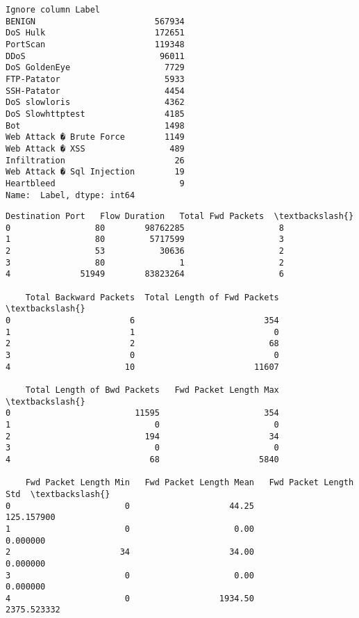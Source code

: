 \documentclass[11pt]{article}
\makeatletter
\newcommand{\boxspacing}{\kern\kvtcb@left@rule\kern\kvtcb@boxsep}
\newcommand{\prompt}[4]{
        \ttfamily\llap{{\color{#2}[#3]:\hspace{3pt}#4}}\vspace{-\baselineskip}
    }
\makeatother
\begin{document}
    \begin{Verbatim}[commandchars=\\\{\}]
Ignore column Label
BENIGN                        567934
DoS Hulk                      172651
PortScan                      119348
DDoS                           96011
DoS GoldenEye                   7729
FTP-Patator                     5933
SSH-Patator                     4454
DoS slowloris                   4362
DoS Slowhttptest                4185
Bot                             1498
Web Attack � Brute Force        1149
Web Attack � XSS                 489
Infiltration                      26
Web Attack � Sql Injection        19
Heartbleed                         9
Name:  Label, dtype: int64
    \end{Verbatim}

            \begin{tcolorbox}[breakable, size=fbox, boxrule=.5pt, pad at break*=1mm, opacityfill=0]
\prompt{Out}{outcolor}{11}{\boxspacing}
\begin{Verbatim}[commandchars=\\\{\}]
    Destination Port   Flow Duration   Total Fwd Packets  \textbackslash{}
0                 80        98762285                   8
1                 80         5717599                   3
2                 53           30636                   2
3                 80               1                   2
4              51949        83823264                   6

    Total Backward Packets  Total Length of Fwd Packets  \textbackslash{}
0                        6                          354
1                        1                            0
2                        2                           68
3                        0                            0
4                       10                        11607

    Total Length of Bwd Packets   Fwd Packet Length Max  \textbackslash{}
0                         11595                     354
1                             0                       0
2                           194                      34
3                             0                       0
4                            68                    5840

    Fwd Packet Length Min   Fwd Packet Length Mean   Fwd Packet Length Std  \textbackslash{}
0                       0                    44.25              125.157900
1                       0                     0.00                0.000000
2                      34                    34.00                0.000000
3                       0                     0.00                0.000000
4                       0                  1934.50             2375.523332


\end{Verbatim}
\end{tcolorbox}
\end{document}
